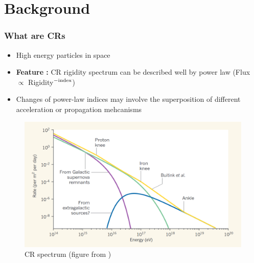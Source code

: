 \documentclass{beamer}
\begin{document}


\section{Background}
\begin{frame}
\frametitle{What are CRs}
\begin{itemize}
  \item High energy particles in space
  \item \textbf{Feature :} CR rigidity spectrum can be
  described well by power law (Flux $\propto$ Rigidity$^{\rm -index}$)
  \item Changes of power-law indices 
  may involve the superposition of different acceleration or propagation mehcanisms
\end{itemize}
\end{frame}
\begin{frame}
  \begin{figure}
  \includegraphics[width=\textwidth]{figure/andrew_superposition.png}
  \caption{
    CR spectrum
    (figure from \cite{taylor2016_crspectrumsuperposition})
  }
  \end{figure}
\end{frame}
\end{document}
